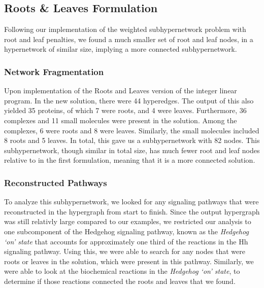 \documentclass[12pt,twoside]{reedthesis}
\theoremstyle{definition}
\begin{document}
   \subsection{Roots \& Leaves Formulation}

   Following our implementation of the weighted subhypernetwork problem with root and leaf penalties, we found a much smaller set of root and leaf nodes, in a hypernetwork of similar size, implying a more connected subhypernetwork.\par

   \subsubsection{Network Fragmentation}

   Upon implementation of the Roots and Leaves version of the integer linear program. In the new solution, there were 44 hyperedges. The output of this also yielded 35 proteins, of which 7 were roots, and 4 were leaves. Furthermore, 36 complexes and 11 small molecules were present in the solution. Among the complexes, 6 were roots and 8 were leaves. Similarly, the small molecules included 8 roots and 5 leaves. In total, this gave us a subhypernetwork with 82 nodes. This subhypernetwork, though similar in total size, has much fewer root and leaf nodes relative to in the first formulation, meaning that it is a more connected solution.\par

   \subsubsection{Reconstructed Pathways}

   To analyze this subhypernetwork, we looked for any signaling pathways that were reconstructed in the hypergraph from start to finish. Since the output hypergraph was still relativly large compared to our examples, we restricted our analysis to one subcomponent of the Hedgehog signaling pathway, known as the \textit{Hedgehog `on' state} that accounts for approximately one third of the reactions in the Hh signaling pathway. Using this, we were able to search for any nodes that were roots or leaves in the solution, which were present in this pathway. Similarly, we were able to look at the biochemical reactions in the \textit{Hedgehog `on' state}, to determine if those reactions connected the roots and leaves that we found.\par
\end{document}
